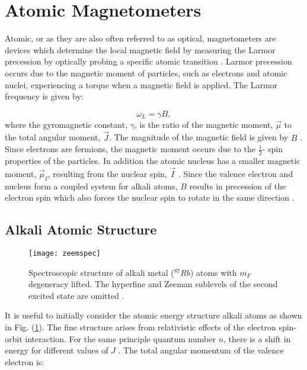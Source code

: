 \section{\label{sec:level1}Atomic Magnetometers}
Atomic, or as they are also often referred to as optical, magnetometers are devices which determine the local magnetic field by measuring the Larmor precession by optically probing a specific atomic transition \citep{Kitching2008MicrofabricatedApplications}. Larmor precession occurs due to the magnetic moment of particles, such as electrons and atomic nuclei, experiencing a torque when a magnetic field is applied. The Larmor frequency is given by: 

\begin{equation}
\label{eq:interactionham0}
\omega_{L}=\gamma B,
\end{equation}
where the gyromagnetic constant, $\gamma$, is the ratio of the magnetic moment, $\vec{\mu}$ to the total angular moment, $\vec{J}$. The magnitude of the magnetic field is given by $B$ \citep{Kitching2011AtomicReview}. Since electrons are fermions, the magnetic moment occurs due to the $\frac{1}{2}$- spin properties of the particles. In addition the atomic nucleus has a smaller magnetic moment, $\vec{\mu}_I$, resulting from the nuclear spin, $\vec{I}$ \citep{Foot2005AtomicPhysics}. Since the valence electron and nucleus form a coupled system for alkali atoms, $B$ results in precession of the electron spin which also forces the nuclear spin to rotate in the same direction \citep{Seltzer2008AtomicMagnetometery}. 

\subsection{Alkali Atomic Structure}
\begin{figure}[b]
\texttt{[image: zeemspec]}
\caption{\label{fig:zeemspec}Spectroscopic structure of alkali metal ($^{87}Rb$) atoms with $m_{F}$ degeneracy lifted. The hyperfine and Zeeman sublevels of the second excited state are omitted \citep{Li2017EllipticalVapor}.}
\end{figure}

It is useful to initially consider the atomic energy structure alkali atoms as shown in Fig. (\ref{fig:zeemspec}). The fine structure arises from relativistic effects of the electron spin-orbit interaction. For the same principle quantum number $n$, there is a shift in energy for different values of $J$ \citep{Steane2002AtomicMatter}. The total angular momentum of the valence electron is: 

